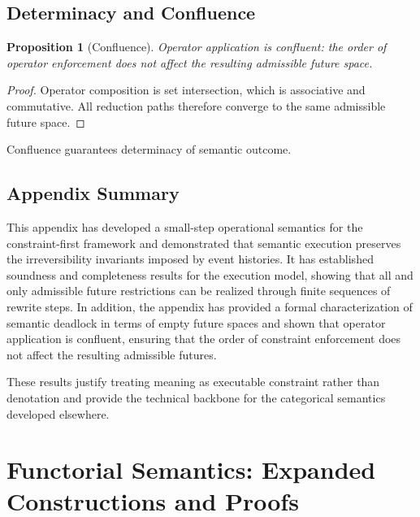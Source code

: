 \documentclass[11pt]{article}
\newtheorem{proposition}{Proposition}
\begin{document}
\subsection{Determinacy and Confluence}

\begin{proposition}[Confluence]
Operator application is confluent: the order of operator enforcement does not
affect the resulting admissible future space.
\end{proposition}

\begin{proof}
Operator composition is set intersection, which is associative and commutative.
All reduction paths therefore converge to the same admissible future space.
\end{proof}

Confluence guarantees determinacy of semantic outcome.

\subsection{Appendix Summary}

This appendix has developed a small-step operational semantics for the
constraint-first framework and demonstrated that semantic execution preserves
the irreversibility invariants imposed by event histories. It has established
soundness and completeness results for the execution model, showing that all and
only admissible future restrictions can be realized through finite sequences of
rewrite steps. In addition, the appendix has provided a formal characterization
of semantic deadlock in terms of empty future spaces and shown that operator
application is confluent, ensuring that the order of constraint enforcement does
not affect the resulting admissible futures.

These results justify treating meaning as executable constraint rather than
denotation and provide the technical backbone for the categorical semantics
developed elsewhere.

\newpage
\section{Functorial Semantics: Expanded Constructions and Proofs}
\end{document}
